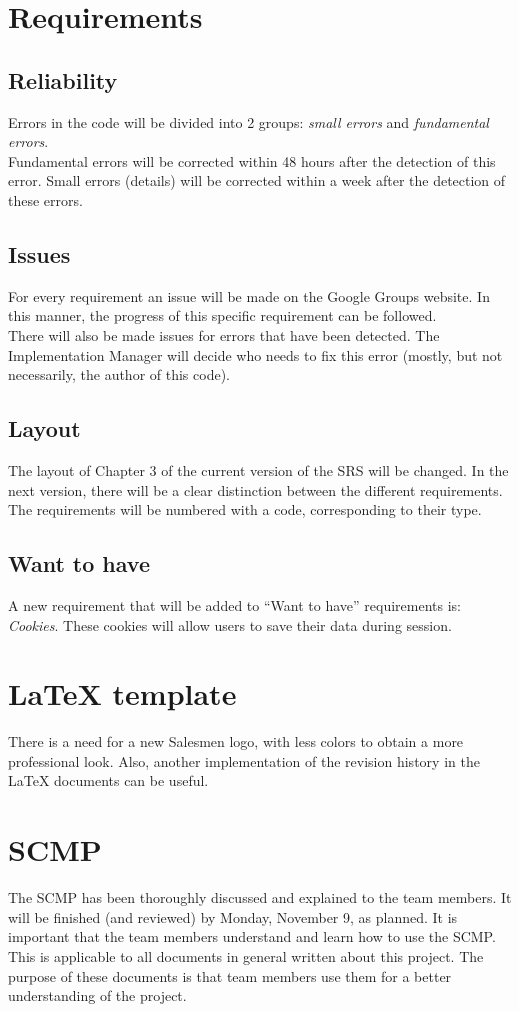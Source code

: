\documentclass[a4paper, 12pt]{article}
\begin{document}
	\section{Requirements}
		\subsection{Reliability}
Errors in the code will be divided into 2 groups: \textit{small errors} and \textit{fundamental errors}. \\ Fundamental errors will be corrected within 48 hours after the detection of this error. Small errors (details) will be corrected within a week after the detection of these errors. 
		\subsection{Issues}
For every requirement an issue will be made on the Google Groups website\cite{site1}. In this manner, the progress of this specific requirement can be followed. \\ There will also be made issues for errors that have been detected. The Implementation Manager will decide who needs to fix this error (mostly, but not necessarily, the author of this code).
		\subsection{Layout}
The layout of Chapter 3 of the current version of the SRS will be changed. In the next version, there will be a clear distinction between the different requirements. The requirements will be numbered with a code, corresponding to their type.
		\subsection{Want to have}
A new requirement that will be added to ``Want to have'' requirements is: \textit{Cookies}. These cookies will allow users to save their data during session.
	\section{\LaTeX{} template}
There is a need for a new Salesmen logo, with less colors to obtain a more professional look. Also, another implementation of the revision history in the \LaTeX{} documents can be useful.

	\section{SCMP}
The SCMP has been thoroughly discussed and explained to the team members. It will be finished (and reviewed) by Monday, November 9, as planned. It is important that the team members understand and learn how to use the SCMP. This is applicable to all documents in general written about this project. The purpose of these documents is that team members use them for a better understanding of the project.
\end{document}
